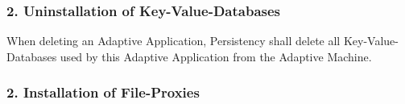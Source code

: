 \subsubsection*{2. Uninstallation of Key-\/\+Value-\/\+Databases}


\begin{DoxyItemize}
\item When deleting an Adaptive Application, Persistency shall delete all Key-\/\+Value-\/\+Databases used by this Adaptive Application from the Adaptive Machine.
\end{DoxyItemize}

\subsubsection*{2. Installation of File-\/\+Proxies}


